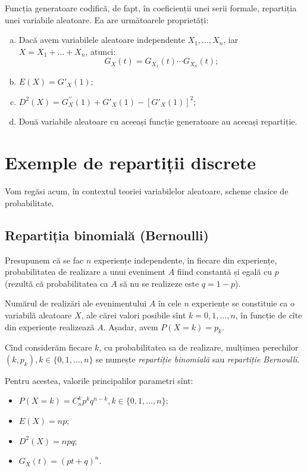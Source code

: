 Funcția generatoare codifică, de fapt, în coeficienții unei serii formale,
repartiția unei variabile aleatoare. Ea are următoarele proprietăți:
\begin{enumerate}[(a)]
\item Dacă avem variabilele aleatoare independente $ X_1, \dots, X_n $,
  iar $ X = X_1 + \dots + X_n $, atunci:
  \[
    G_X(t) = G_{X_1}(t) \cdots G_{X_n}(t);
  \]
\item $ E(X) = G'_X(1) $;
\item $ D^2(X) = G_X^{\prime\prime}(1) + G'_X(1) - [G'_X(1)]^2 $;
\item Două variabile aleatoare cu aceeași funcție generatoare au aceeași repartiție.
\end{enumerate}


\section{Exemple de repartiții discrete}

\indent\indent Vom regăsi acum, în contextul teoriei variabilelor aleatoare,
scheme clasice de probabilitate.



\subsection{Repartiția binomială (Bernoulli)}
\indent\indent Presupunem că se fac $ n $ experiențe independente, în fiecare din
experiențe, probabilitatea de realizare a unui eveniment $ A $ fiind constantă
și egală cu $ p $ (rezultă că probabilitatea ca $ A $ să nu se realizeze este
$ q = 1 - p $).

Numărul de realizări ale evenimentului $ A $ în cele $ n $ experiențe se constituie
ca o variabilă aleatoare $ X $, ale cărei valori posibile sînt $ k = 0, 1, \dots, n $,
în funcție de cîte din experiențe realizează $ A $. Așadar, avem $ P(X = k) = p_k $.

Cînd considerăm fiecare $ k $, cu probabilitatea sa de realizare, mulțimea perechilor
$ (k, p_k), k \in \{0, 1, \dots, n \} $ se numește \emph{repartiție binomială} sau
\emph{repartiție Bernoulli}.

Pentru acestea, valorile principalilor parametri sînt:
\begin{itemize}
\item $ P(X = k) = C_n^k p^k q^{n-k}, k \in \{0, 1, \dots, n\} $;
\item $ E(X) = np $;
\item $ D^2(X) = npq $;
\item $ G_X(t) = (pt + q)^n $.
\end{itemize}

